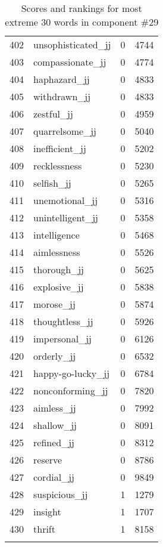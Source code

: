 \begin{longtable}[!htbp]{| rlr@{.}l |}
    402 & unsophisticated\_jj & 0 & 4744 \\
    403 & compassionate\_jj & 0 & 4774 \\
    404 & haphazard\_jj & 0 & 4833 \\
    405 & withdrawn\_jj & 0 & 4833 \\
    406 & zestful\_jj & 0 & 4959 \\
    407 & quarrelsome\_jj & 0 & 5040 \\
    408 & inefficient\_jj & 0 & 5202 \\
    409 & recklessness & 0 & 5230 \\
    410 & selfish\_jj & 0 & 5265 \\
    411 & unemotional\_jj & 0 & 5316 \\
    412 & unintelligent\_jj & 0 & 5358 \\
    413 & intelligence & 0 & 5468 \\
    414 & aimlessness & 0 & 5526 \\
    415 & thorough\_jj & 0 & 5625 \\
    416 & explosive\_jj & 0 & 5838 \\
    417 & morose\_jj & 0 & 5874 \\
    418 & thoughtless\_jj & 0 & 5926 \\
    419 & impersonal\_jj & 0 & 6126 \\
    420 & orderly\_jj & 0 & 6532 \\
    421 & happy-go-lucky\_jj & 0 & 6784 \\
    422 & nonconforming\_jj & 0 & 7820 \\
    423 & aimless\_jj & 0 & 7992 \\
    424 & shallow\_jj & 0 & 8091 \\
    425 & refined\_jj & 0 & 8312 \\
    426 & reserve & 0 & 8786 \\
    427 & cordial\_jj & 0 & 9849 \\
    428 & suspicious\_jj & 1 & 1279 \\
    429 & insight & 1 & 1707 \\
    430 & thrift & 1 & 8158 \\
    \hline
    \caption{Scores and rankings for most extreme 30 words in component \#29} \\
\end{longtable}
